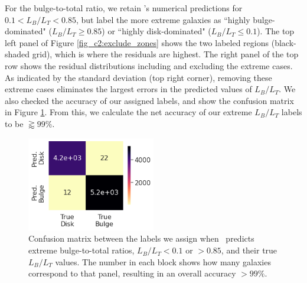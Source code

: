 For the bulge-to-total ratio, we retain \gampen's numerical predictions for $0.1 < L_B/L_T < 0.85$, but label the more extreme galaxies as ``highly bulge-dominated" ($L_B/L_T \geq 0.85$) or ``highly disk-dominated" ($L_B/L_T \leq 0.1$).
The top left panel of Figure \ref{fig_c2:exclude_zones} shows the two labeled regions (black-shaded grid), which is where the residuals are highest. 
The right panel of the top row shows the residual distributions including and excluding the extreme cases. As indicated by the standard deviation (top right corner), removing these extreme cases eliminates the largest errors in the predicted values of $L_B/L_T$. We also checked the accuracy of our assigned labels, and show the confusion matrix in Figure \ref{fig_c2:confusion_matrix}. From this, we calculate the net accuracy of our extreme $L_B/L_T$ labels to be $\gtrapprox99\%$. 

\begin{figure}[htb]
    \centering
    \includegraphics[width
    =0.5\textwidth]{confusion_matrix.png}
    \caption{Confusion matrix between the labels we assign when \gampen\ predicts extreme bulge-to-total ratios, $L_B/L_T <0.1$ or $>0.85$, and their true $L_B/L_T$ values. %
    The number in each block shows how many galaxies correspond to that panel, resulting in an overall accuracy $>99\%$.
    }
    \label{fig_c2:confusion_matrix}
\end{figure}

